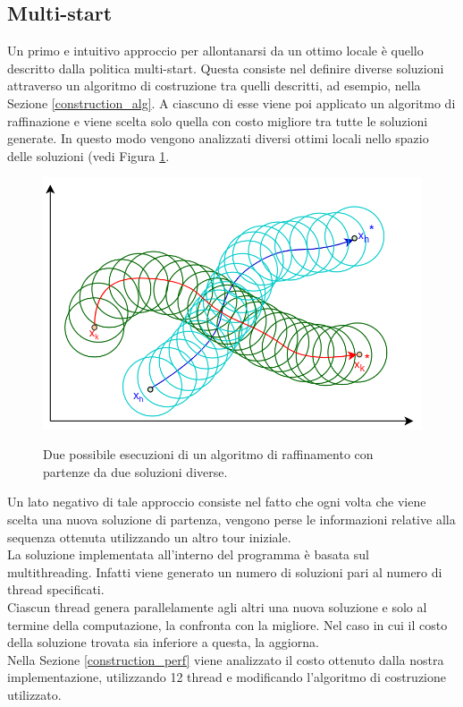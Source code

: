 \subsection{Multi-start}
Un primo e intuitivo approccio per allontanarsi da un ottimo locale è quello descritto dalla politica multi-start. Questa consiste nel definire diverse soluzioni attraverso un algoritmo di costruzione tra quelli descritti, ad esempio, nella Sezione \ref{construction_alg}. A ciascuno di esse viene poi applicato un algoritmo di raffinazione e viene scelta solo quella con costo migliore tra tutte le soluzioni generate. In questo modo vengono analizzati diversi ottimi locali nello spazio delle soluzioni (vedi Figura \ref{multi_start}. 
\begin{figure}[H] 
\begin{center} 
  \includegraphics[scale=0.5]{Images/multistart}\\ 
  \caption{\footnotesize{Due possibile esecuzioni di un algoritmo di raffinamento con partenze da due soluzioni diverse.}}
  \label{multi_start}
\end{center}
\end{figure}
Un lato negativo di tale approccio consiste nel fatto che ogni volta che viene scelta una nuova soluzione di partenza, vengono perse le informazioni relative alla sequenza ottenuta utilizzando un altro tour iniziale.\\
La soluzione implementata all'interno del programma è basata sul multithreading. Infatti viene generato un numero di soluzioni pari al numero di thread specificati.\\
Ciascun thread genera parallelamente agli altri una nuova soluzione e solo al termine della computazione, la confronta con la migliore. Nel caso in cui il costo della soluzione trovata sia inferiore a questa, la aggiorna. \\
Nella Sezione \ref{construction_perf} viene analizzato il costo ottenuto dalla nostra implementazione, utilizzando 12 thread e modificando l'algoritmo di costruzione utilizzato.

